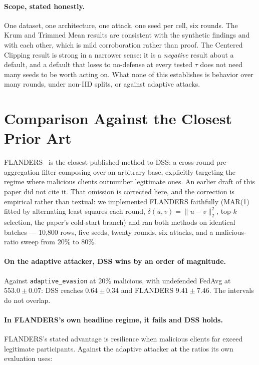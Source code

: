 \documentclass[11pt,a4paper]{article}
\begin{document}
\paragraph{Scope, stated honestly.} One dataset, one architecture, one
attack, one seed per cell, six rounds. The Krum and Trimmed Mean results
are consistent with the synthetic findings and with each other, which is
mild corroboration rather than proof. The Centered Clipping result is
strong in a narrower sense: it is a \emph{negative} result about a
default, and a default that loses to no-defense at every tested $\tau$
does not need many seeds to be worth acting on. What none of this
establishes is behavior over many rounds, under non-IID splits, or against
adaptive attacks.

\section{Comparison Against the Closest Prior Art}
\label{sec:flanders}

FLANDERS~\cite{gabrielli2024} is the closest published method to DSS: a
cross-round pre-aggregation filter composing over an arbitrary base,
explicitly targeting the regime where malicious clients outnumber
legitimate ones. An earlier draft of this paper did not cite it. That
omission is corrected here, and the correction is empirical rather than
textual: we implemented FLANDERS faithfully (MAR(1) fitted by
alternating least squares each round, $\delta(u,v) = \|u-v\|_2^2$,
top-$k$ selection, the paper's cold-start branch) and ran both methods on
identical batches --- 10{,}800 rows, five seeds, twenty rounds, six
attacks, and a malicious-ratio sweep from 20\% to 80\%.

\paragraph{On the adaptive attacker, DSS wins by an order of magnitude.}
Against \texttt{adaptive\_evasion} at 20\% malicious, with undefended
FedAvg at $553.0 \pm 0.07$: DSS reaches $0.64 \pm 0.34$ and FLANDERS
$9.41 \pm 7.46$. The intervals do not overlap.

\paragraph{In FLANDERS's own headline regime, it fails and DSS holds.}
FLANDERS's stated advantage is resilience when malicious clients far
exceed legitimate participants. Against the adaptive attacker at the
ratios its own evaluation uses:
\end{document}
